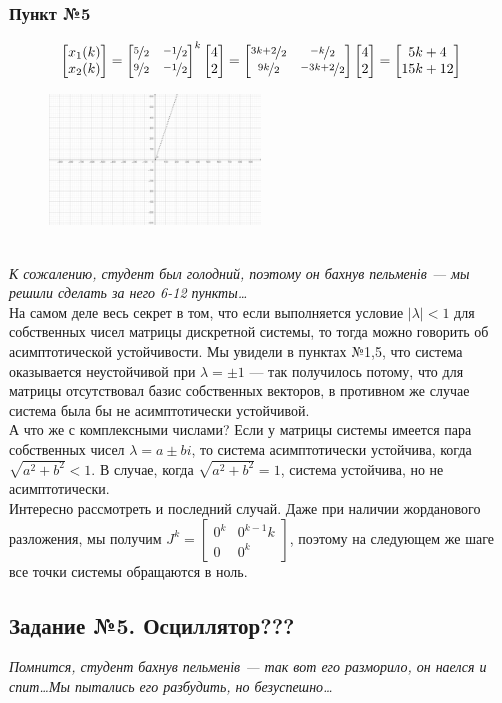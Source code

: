 \documentclass[a3paper,14pt]{extarticle}
\begin{document}
\subsubsection*{Пункт №5}
$$\begin{bmatrix}
    x_1(k) \\ x_2(k)
\end{bmatrix} = \begin{bmatrix}
    \nicefrac{5}{2} & \nicefrac{-1}{2} \\
    \nicefrac{9}{2} & \nicefrac{-1}{2}
\end{bmatrix}^k\begin{bmatrix}
    4 \\ 2
\end{bmatrix} = \begin{bmatrix}
    \nicefrac{3k+2}{2} & \nicefrac{-k}{2} \\ \nicefrac{9k}{2} & \nicefrac{-3k+2}{2}
\end{bmatrix}\begin{bmatrix}
    4 \\ 2
\end{bmatrix} = \begin{bmatrix}
    5k+4 \\ 15k+12
\end{bmatrix}$$
\begin{figure}[h]
    \centering\includegraphics[width=0.5\textwidth]{4.5.png}
\end{figure} \\[1em]
\textit{К сожалению, студент был голодний, поэтому он бахнув пельменів --- мы решили сделать за него 6-12 пункты\ldots}\\[0.5em]
На самом деле весь секрет в том, что если выполняется условие $|\lambda| < 1$ для собственных чисел матрицы дискретной системы, то тогда можно говорить об асимптотической устойчивости. Мы увидели в пунктах №1,5, что система оказывается неустойчивой при $\lambda = \pm1$ --- так получилось потому, что для матрицы отсутствовал базис собственных векторов, в противном же случае система была бы не асимптотически устойчивой.\\[0.5em]
А что же с комплексными числами? Если у матрицы системы имеется пара собственных чисел $\lambda = a\pm bi$, то система асимптотически устойчива, когда $\sqrt{a^2+b^2}<1$. В случае, когда $\sqrt{a^2+b^2}=1$, система устойчива, но не асимптотически.\\[0.5em]
Интересно рассмотреть и последний случай. Даже при наличии жорданового разложения, мы получим $J^k = \left[\begin{smallmatrix}
    0^k & 0^{k-1}k \\ 0 & 0^k
\end{smallmatrix}\right]$, поэтому на следующем же шаге все точки системы обращаются в ноль.
\subsection*{\centering Задание №5. Осциллятор???}
\textit{Помнится, студент бахнув пельменів --- так вот его разморило, он наелся и спит\ldots Мы пытались его разбудить, но безуспешно\ldots}
\end{document}
